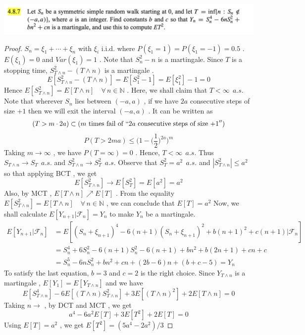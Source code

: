 \documentclass[12pt, A4]{article}
\newcommand{\N}{\mathbb{N}}
\newcommand{\F}{\mathcal{F}}
\newcommand{\foranyn}{\quad \forall \, n\in \N}
\begin{document}
\includegraphics[width=17cm]{Exer4.8.7.png}

\begin{proof}
    $S_n = \xi_1 + \cdots + \xi_n$ with $\xi_i$ i.i.d. where $P(\xi_1 = 1) = P(\xi_1 = -1)=0.5$ . $E(\xi_1)=0$ and $Var(\xi_1)=1$ . Note that $S_n^2 - n$ is a martingale. Since $T$ is a stopping time, $S_{T\wedge n}^2 -(T\wedge n)$ is a martingale . $$E[S_{T\wedge n}^2 -(T\wedge n)] = E[S_1^2 -1] = E[\xi_1^2]-1 =0$$ Hence $E[S_{T\wedge n}^2] = E[T\wedge n]\foranyn$ . Here, we shall claim that $T<\infty\;\,a.s.$ \\ Note that wherever $S_n$ lies between $(-a, a)$ , if we have $2a$ consecutive steps of size $+1$ then we will exit the interval $(-a, a)$ . It can be written as $$(T>m\cdot 2a)\subset (m \text{ times fail of } ``2a \text{ consecutive steps of size +1}'') $$ 
    $$P(T>2ma) \leq \bigg(1-\big(\frac{1}{2}\big)^{2a} \bigg)^m $$
    Taking $m\rightarrow \infty$ , we have $P(T=\infty) = 0$ . Hence, $T<\infty\;\,a.s.$ Thus $S_{T\wedge n}\rightarrow S_T\;\,a.s.$ and $S_{T\wedge n}^2\rightarrow S_T^2\;\,a.s.$  Observe that $S_T^2=a^2\;\,a.s.$ and $|S_{T\wedge n}^2|\leq a^2$ so that applying BCT , we get $$E[S_{T\wedge n}^2]\rightarrow E[S_T^2]=E[a^2]=a^2 $$ Also, by MCT , $E[T\wedge n]\nearrow E[T]$ . From the equality $E[S_{T\wedge n}^2]=E[T\wedge n]\foranyn$ , we can conclude that $E[T]=a^2$
    Now, we shall calculate $E[Y_{n+1}|\F_n]=Y_n$ to make $Y_n$ be a martingale.
    \begin{align*}
        E[Y_{n+1}|\F_n] &= E[(S_n+\xi_{n+1})^4-6(n+1)(S_n+\xi_{n+1})^2+b(n+1)^2+c(n+1)|\F_n] \\ &= S_n^4 + 6S_n^2 -6(n+1)S_n^2 -6(n+1) + bn^2 +b(2n+1)+cn +c \\ &= S_n^5-6nS_n^2 +bn^2 +cn +(2b-6)n +(b+c-5) =Y_n
    \end{align*}
    To satisfy the last equation, $b=3$ and $c=2$ is the right choice. Since $Y_{T\wedge n}$ is a martingale , $E[Y_1]=E[Y_{T\wedge n}]$ and we have 
    $$E[S_{T\wedge n}^4]-6E[(T\wedge n)S_{T\wedge n}^2]+3E[(T\wedge n)^2]+2E[T\wedge n]=0 $$
    Taking $n\rightarrow$ , by DCT and MCT , we get 
    $$a^4-6a^2 E[T]+3E[T^2]+2E[T]=0 $$
    Using $E[T]=a^2$ , we get $E[T^2]=(5a^4-2a^2)/3$
\end{proof}
\end{document}
